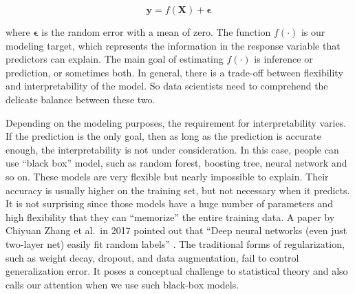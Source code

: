 \documentclass[12pt,]{krantz}
\begin{document}
\begin{equation}
\mathbf{y}=f(\mathbf{X})+\symbf{\epsilon}
\label{eq:generalmodeleq}
\end{equation}

where \(\symbf{\epsilon}\) is the random error with a mean of zero. The function \(f(\cdot)\) is our modeling target, which represents the information in the response variable that predictors can explain. The main goal of estimating \(f(\cdot)\) is inference or prediction, or sometimes both. In general, there is a trade-off between flexibility and interpretability of the model. So data scientists need to comprehend the delicate balance between these two.

Depending on the modeling purposes, the requirement for interpretability varies. If the prediction is the only goal, then as long as the prediction is accurate enough, the interpretability is not under consideration. In this case, people can use ``black box'' model, such as random forest, boosting tree, neural network and so on. These models are very flexible but nearly impossible to explain. Their accuracy is usually higher on the training set, but not necessary when it predicts. It is not surprising since those models have a huge number of parameters and high flexibility that they can ``memorize'' the entire training data. A paper by Chiyuan Zhang et al.~in 2017 pointed out that ``Deep neural networks (even just two-layer net) easily fit random labels'' \citep{rethinkDL}. The traditional forms of regularization, such as weight decay, dropout, and data augmentation, fail to control generalization error. It poses a conceptual challenge to statistical theory and also calls our attention when we use such black-box models.
\end{document}
